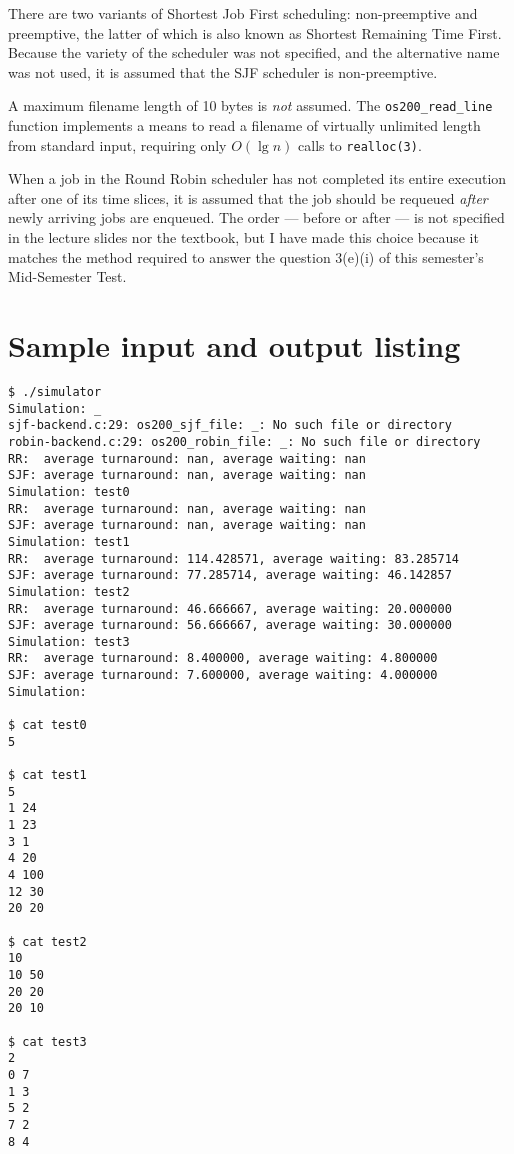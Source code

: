 \documentclass[a4paper,12pt,titlepage]{article}
\begin{document}
There are two variants of Shortest Job First scheduling: non-preemptive and
preemptive, the latter of which is also known as Shortest Remaining Time First.
Because the variety of the scheduler was not specified, and the alternative
name was not used, it is assumed that the SJF scheduler is non-preemptive.

A maximum filename length of 10 bytes is \textit{not} assumed. The
\texttt{os200\_read\_line} function implements a means to read a filename of
virtually unlimited length from standard input, requiring only $O(\lg n)$ calls
to \texttt{realloc(3)}.

When a job in the Round Robin scheduler has not completed its entire execution
after one of its time slices, it is assumed that the job should be requeued
\textit{after} newly arriving jobs are enqueued. The order --- before or after
--- is not specified in the lecture slides nor the textbook, but I have made
this choice because it matches the method required to answer the question
3(e)(i) of this semester's Mid-Semester Test.

\newpage

\section{Sample input and output listing}

\begin{lstlisting}
$ ./simulator
Simulation: _
sjf-backend.c:29: os200_sjf_file: _: No such file or directory
robin-backend.c:29: os200_robin_file: _: No such file or directory
RR:  average turnaround: nan, average waiting: nan
SJF: average turnaround: nan, average waiting: nan
Simulation: test0
RR:  average turnaround: nan, average waiting: nan
SJF: average turnaround: nan, average waiting: nan
Simulation: test1
RR:  average turnaround: 114.428571, average waiting: 83.285714
SJF: average turnaround: 77.285714, average waiting: 46.142857
Simulation: test2
RR:  average turnaround: 46.666667, average waiting: 20.000000
SJF: average turnaround: 56.666667, average waiting: 30.000000
Simulation: test3
RR:  average turnaround: 8.400000, average waiting: 4.800000
SJF: average turnaround: 7.600000, average waiting: 4.000000
Simulation:

$ cat test0
5

$ cat test1
5
1 24
1 23
3 1
4 20
4 100
12 30
20 20

$ cat test2
10
10 50
20 20
20 10

$ cat test3
2
0 7
1 3
5 2
7 2
8 4
\end{lstlisting}
\end{document}
